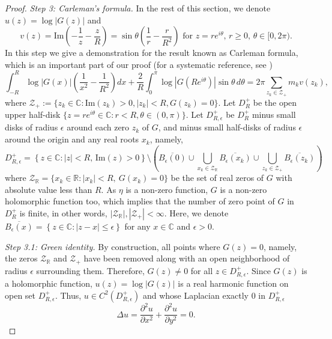 \documentclass[11pt,twoside]{article} %
\begin{document}
\begin{proof}
\emph{Step 3: Carleman's formula.} In the rest of this section, we denote $u(z)=\log|G(z)|$ and
\begin{equation*}
    v(z)=\mathrm{Im}\left(-\frac{1}{z}-\frac{z}{R}\right) = \sin\theta\left(\frac{1}{r} - \frac{r}{R^2}\right) \text{ for } z=re^{i\theta},\, r\geq 0,\, \theta \in [0,2\pi).
\end{equation*}
In this step we give a demonstration for the result known as Carleman formula, which is an important part of our proof (for a systematic reference, see \cite{levin1980distribution})
\begin{equation}
\label{eqn:dung_carleman_formula}
    \int_{-R}^R \log|G(x)| \left(\frac{1}{x^2} - \frac{1}{R^2}\right) dx + \frac{2}{R} \int_0^\pi \log|G(Re^{i\theta})| \sin\theta \, d\theta = 2\pi \sum_{z_k \in \mathcal{Z}_{+}} m_k v(z_k),
\end{equation}
where $\mathcal{Z}_{+}:= \{z_k \in \mathbb{C} : \text{Im}(z_k) > 0, |z_k| < R, G(z_k) = 0\}$.
Let $D_R^+$ be the open upper half-disk $\{z = r e^{i\theta} \in \mathbb{C} : r < R, \theta \in (0, \pi)\}$. Let $D_{R,\epsilon}^+$ be $D_R^+$ minus small disks of radius $\epsilon$ around each zero $z_k$ of $G$, and minus small half-disks of radius $\epsilon$ around the origin and any real roots $x_k$, namely,
$$ D_{R,\epsilon}^+ = \left\{ z \in \mathbb{C} : |z| < R, \, \text{Im}(z) > 0 \right\} \setminus \left( \overline{B_\epsilon(0)} \cup \bigcup_{x_k \in \mathcal{Z}_{\mathbb{R}}} \overline{B_\epsilon(x_k)} \cup \bigcup_{z_k \in \mathcal{Z}_+} \overline{B_\epsilon(z_k)} \right)$$
where $\mathcal{Z}_{\mathbb{R}} = \{x_k \in \mathbb{R} : |x_k| <R,\ G(x_k) = 0\}$ be the set of real zeros of $G$ with absolute value less than $R$. As $\eta$ is a non-zero function, $G$ is a non-zero holomorphic function too, which implies that the number of zero point of $G$ in ${D_R^{+}}$ is finite, in other words, $|\mathcal{Z}_{\mathbb{R}}|, |\mathcal{Z}_{+}| < \infty$. Here, we denote $\overline{B_\epsilon(x)} = \left\{ z \in \mathbb{C} : |z - x| \le \epsilon \right\}$ for any $x \in \mathbb{C}$ and $\epsilon > 0$. 


\textit{Step 3.1: Green identity.} By construction, all points where $G(z) = 0$, namely, the zeros $\mathcal{Z}_{\mathbb{R}}$ and $\mathcal{Z}_+$ have been removed along with an open neighborhood of radius $\epsilon$ surrounding them. Therefore, $G(z) \neq 0$ for all $z \in D_{R,\epsilon}^+$. Since $G(z)$ is a holomorphic function, $u(z) = \log|G(z)|$ is a real harmonic function on open set $D_{R,\epsilon}^+$. Thus, $u \in C^2(D^{+}_{R,\epsilon})$ and whose Laplacian exactly 0 in ${D_{R,\epsilon}^+}$
$$\Delta u = \frac{\partial^2 u}{\partial x^2} + \frac{\partial^2 u}{\partial y^2} = 0.$$


\end{proof}
\end{document}
